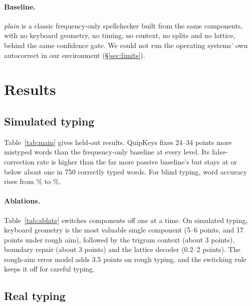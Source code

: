 \documentclass[11pt,a4paper]{article}
\newcommand{\qk}{QuipKeys}
\begin{document}
\paragraph{Baseline.} \emph{plain} is a classic frequency-only spellchecker built from the same components, with no keyboard geometry, no timing, no context, no splits and no lattice, behind the same confidence gate. We could not run the operating systems' own autocorrect in our environment (\S\ref{sec:limits}).

\section{Results}

\subsection{Simulated typing}
Table~\ref{tab:main} gives held-out results. \qk{} fixes 24--34 points more mistyped words than the frequency-only baseline at every level. Its false-correction rate is higher than the far more passive baseline's but stays at or below about one in 750 correctly typed words. For blind typing, word accuracy rises from \BlindNone\% to \BlindAcc\%.

\begin{table}[t]
\centering\small
\caption{Held-out results on simulated typing (1,500 Brown test sentences per level).}
\label{tab:main}

\end{table}

\paragraph{Ablations.} Table~\ref{tab:ablate} switches components off one at a time. On simulated typing, keyboard geometry is the most valuable single component (5--6 points, and 17 points under rough aim), followed by the trigram context (about 3 points), boundary repair (about 3 points) and the lattice decoder (0.2--2 points). The rough-aim error model adds 3.5 points on rough typing, and the switching rule keeps it off for careful typing.

\begin{table}[t]
\centering\small
\caption{Ablations: share of mistyped words fixed (held-out simulated typing).}
\label{tab:ablate}

\end{table}

\subsection{Real typing}
\label{sec:real}
\end{document}
